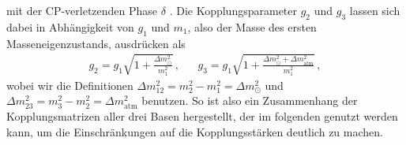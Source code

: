 mit der CP-verletzenden Phase $\delta$ \cite{päspaper}.
Die Kopplungsparameter $g_2$ und $g_3$ lassen sich dabei in Abhängigkeit von $g_1$ und $m_1$, also der Masse des ersten Masseneigenzustands, ausdrücken als
\begin{align}
    g_2 = g_1 \sqrt{1 + \frac{\Delta m^2_\odot}{m^2_1}}\,, && g_3 = g_1 \sqrt{1 + \frac{\Delta m^2_\odot + \Delta m^2_\text{atm}}{m^2_1}} \,,
    \label{eq:g2g3}
\end{align}
wobei wir die Definitionen $\Delta m^2_{1 2} = m^2_2 - m^2_1 = \Delta m^2_\odot$ und $\Delta m^2_{23} = m^2_3 - m^2_2 = \Delta m^2_\text{atm}$ benutzen.
So ist also ein Zusammenhang der Kopplungsmatrizen aller drei Basen hergestellt, der im folgenden genutzt werden kann, um die Einschränkungen auf die Kopplungsstärken deutlich zu machen.






